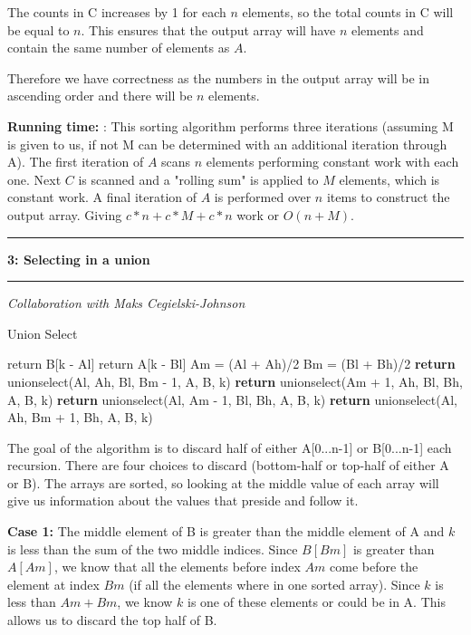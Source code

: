 \documentclass[11pt]{article}
\newcommand\question[2]{\vspace{.25in}\hrule\textbf{#1: #2}\vspace{.5em}\hrule\vspace{.10in}}
\newcommand\runtime{\vspace{.10in}\textbf{Running time: }}
\begin{document}
	The counts in C increases by 1 for each $n$ elements, so the total counts in C will be equal to $n$. This ensures that the output array will have $n$ elements and contain the same number of elements as $A$.
	
	Therefore we have correctness as the numbers in the output array will be in ascending order and there will be $n$ elements.

\runtime: This sorting algorithm performs three iterations (assuming M is given to us, if not M can be determined with an additional iteration through A). The first iteration  of $A$ scans $n$ elements performing constant work with each one. Next $C$ is scanned and a "rolling sum" is applied to $M$ elements, which is constant work. A final iteration of $A$ is performed over $n$ items to construct the output array. Giving $c*n + c*M + c*n$ work or $O(n + M)$.

\newpage
\question{3}{Selecting in a union}
\textit{Collaboration with Maks Cegielski-Johnson}

\begin{algorithm}[H]
\caption{Union Select}
\label{CHalgorithm}
\begin{algorithmic}[1]
\State return B[k - Al]
\EndIf
{}
\State return A[k - Bl]
\EndIf
\newline
\State Am = (Al + Ah)/2 
\State Bm = (Bl + Bh)/2 
\newline
{}
\State \textbf{return} unionselect(Al, Ah, Bl, Bm - 1, A, B, k)
\Else
\State \textbf{return} unionselect(Am + 1, Ah, Bl, Bh, A, B, k)
\EndIf
\Else
{}
\State \textbf{return} unionselect(Al, Am - 1, Bl, Bh, A, B, k)
\Else 
\State \textbf{return} unionselect(Al, Ah, Bm + 1, Bh, A, B, k)
\EndIf

\EndIf
\EndProcedure
\end{algorithmic}
\end{algorithm}

The goal of the algorithm is to discard half of either A[0...n-1] or B[0...n-1] each recursion. There are four choices to discard (bottom-half or top-half of either A or B). The arrays are sorted, so looking at the middle value of each array will give us information about the values that preside and follow it.

\textbf{Case 1:} The middle element of B is greater than the middle element of A and $k$ is less than the sum of the two middle indices. Since $B[Bm]$ is greater than $A[Am]$, we know that all the elements before index $Am$ come before the element at index $Bm$ (if all the elements where in one sorted array). Since $k$ is less than $Am + Bm$, we know $k$ is one of these elements or could be in A. This allows us to discard the top half of B.
\end{document}
